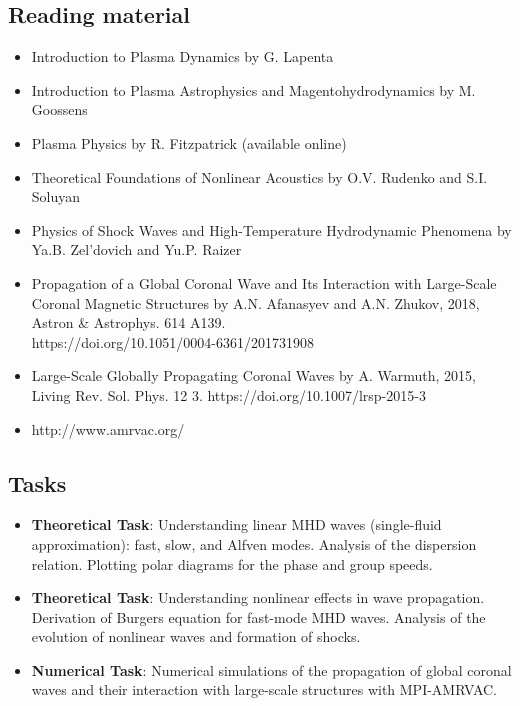 \documentclass[11pt]{article}
\begin{document}
\subsection{Reading material}
\begin{itemize}
\item Introduction to Plasma Dynamics by G. Lapenta
\item Introduction to Plasma Astrophysics and Magentohydrodynamics by M. Goossens
\item Plasma Physics by R. Fitzpatrick (available online)
\item Theoretical Foundations of Nonlinear Acoustics by O.V. Rudenko and S.I. Soluyan 
\item Physics of Shock Waves and High-Temperature Hydrodynamic Phenomena by Ya.B. Zel'dovich and Yu.P. Raizer
\item Propagation of a Global Coronal Wave and Its Interaction with Large-Scale Coronal Magnetic Structures by A.N. Afanasyev and A.N. Zhukov, 2018, Astron \& Astrophys. 614 A139. \\ https://doi.org/10.1051/0004-6361/201731908
\item Large-Scale Globally Propagating Coronal Waves by A. Warmuth, 2015, Living Rev. Sol. Phys. 12 3. https://doi.org/10.1007/lrsp-2015-3
\item http://www.amrvac.org/
\end{itemize}
\subsection{Tasks}
\begin{itemize}
\item {\bf Theoretical Task}: Understanding linear MHD waves (single-fluid approximation): fast, slow, and Alfven modes. Analysis of the dispersion relation. Plotting polar diagrams for the phase and group speeds.
\item {\bf Theoretical Task}: Understanding nonlinear effects in wave propagation. Derivation of Burgers equation for fast-mode MHD waves. Analysis of the evolution of nonlinear waves and formation of shocks.
\item {\bf Numerical Task}: Numerical simulations of the propagation of global coronal waves and their interaction with large-scale structures with MPI-AMRVAC. 

\end{itemize}
\end{document}
